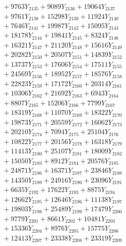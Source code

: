 \documentclass[a4paper,10pt]{article}
\begin{document}
{\begin{align}
&\;  + 9763 Y_{2135} + 9089 Y_{2136} + 19064 Y_{2137} \\[0.3ex]
&\;  + 9761 Y_{2138} + 15298 Y_{2139} + 11924 Y_{2140} \\[0.3ex]
&\;  + 7646 Y_{2141} + 19987 Y_{2142} + 15095 Y_{2143} \\[0.3ex]
&\;  + 18178 Y_{2144} + 19841 Y_{2145} + 8324 Y_{2146} \\[0.3ex]
&\;  + 16321 Y_{2147} + 21120 Y_{2148} + 15616 Y_{2149} \\[0.3ex]
&\;  + 20282 Y_{2150} + 20507 Y_{2151} + 14839 Y_{2152} \\[0.3ex]
&\;  + 13737 Y_{2153} + 17606 Y_{2154} + 17511 Y_{2155} \\[0.3ex]
&\;  + 24569 Y_{2156} + 18952 Y_{2157} + 18576 Y_{2158} \\[0.5ex]\allowbreak
&\;  + 22823 Y_{2159} + 17172 Y_{2160} + 20314 Y_{2161} \\[0.3ex]
&\;  + 10306 Y_{2162} + 21692 Y_{2163} + 6943 Y_{2164} \\[0.3ex]
&\;  + 8807 Y_{2165} + 15206 Y_{2166} + 7799 Y_{2167} \\[0.3ex]
&\;  + 18319 Y_{2168} + 11070 Y_{2169} + 18322 Y_{2170} \\[0.3ex]
&\;  + 19873 Y_{2171} + 20559 Y_{2172} + 16062 Y_{2173} \\[0.3ex]
&\;  + 20210 Y_{2174} + 7094 Y_{2175} + 25104 Y_{2176} \\[0.3ex]
&\;  + 10822 Y_{2177} + 20156 Y_{2178} + 16318 Y_{2179} \\[0.3ex]
&\;  + 11413 Y_{2180} + 25107 Y_{2181} + 18009 Y_{2182} \\[0.3ex]
&\;  + 15050 Y_{2183} + 8912 Y_{2184} + 20576 Y_{2185} \\[0.3ex]
&\;  + 24871 Y_{2186} + 16371 Y_{2187} + 23846 Y_{2188} \\[0.5ex]\allowbreak
&\;  + 14350 Y_{2189} + 24916 Y_{2190} + 23096 Y_{2191} \\[0.3ex]
&\;  + 6635 Y_{2192} + 17622 Y_{2193} + 8875 Y_{2194} \\[0.3ex]
&\;  + 12662 Y_{2195} + 12646 Y_{2196} + 11138 Y_{2197} \\[0.3ex]
&\;  + 19803 Y_{2198} + 25489 Y_{2199} + 17479 Y_{2200} \\[0.3ex]
&\;  + 9779 Y_{2201} + 8661 Y_{2202} + 10481 Y_{2203} \\[0.3ex]
&\;  + 15336 Y_{2204} + 8976 Y_{2205} + 15775 Y_{2206} \\[0.3ex]
&\;  + 12413 Y_{2207} + 23338 Y_{2208} + 23319 Y_{2209} \\[0.3ex]

\end{align}}
\end{document}
